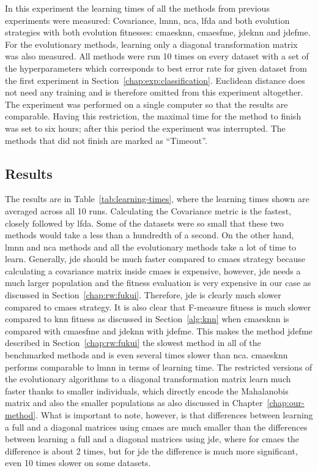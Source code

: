 \documentclass[12pt,a4paper]{report}
\begin{document}
In this experiment the learning times of all the methods from previous experiments were measured: Covariance, \ac{lmnn}, \ac{nca}, \ac{lfda} and both evolution strategies with both evolution fitnesses: \ac{cmaesknn}, \ac{cmaesfme}, \ac{jdeknn} and \ac{jdefme}. For the evolutionary methods, learning only a diagonal transformation matrix was also measured. All methods were run 10 times on every dataset with a set of the hyperparameters which corresponds to best error rate for given dataset from the first experiment in Section~\ref{chap:exp:classification}. Euclidean distance does not need any training and is therefore omitted from this experiment altogether. The experiment was performed on a single computer so that the results are comparable. Having this restriction, the maximal time for the method to finish was set to six hours; after this period the experiment was interrupted. The methods that did not finish are marked as ``Timeout''.

\subsection{Results}

The results are in Table~\ref{tab:learning-times}, where the learning times shown are averaged across all 10 runs. Calculating the Covariance metric is the fastest, closely followed by \ac{lfda}. Some of the datasets were so small that these two methods would take a less than a hundredth of a second. On the other hand, \ac{lmnn} and \ac{nca} methods and all the evolutionary methods take a lot of time to learn. Generally, \ac{jde} should be much faster compared to \ac{cmaes} strategy because calculating a covariance matrix inside \ac{cmaes} is expensive, however, \ac{jde} needs a much larger population and the fitness evaluation is very expensive in our case as discussed in Section~\ref{chap:rw:fukui}. Therefore, \ac{jde} is clearly much slower compared to \ac{cmaes} strategy. It is also clear that \mbox{F-measure} fitness is much slower compared to \ac{knn} fitness as discussed in Section~\ref{alg:knn} when \ac{cmaesknn} is compared with \ac{cmaesfme} and \ac{jdeknn} with \ac{jdefme}. This makes the method \ac{jdefme} described in Section~\ref{chap:rw:fukui} the slowest method in all of the benchmarked methods and is even several times slower than \ac{nca}. \ac{cmaesknn} performs comparable to \ac{lmnn} in terms of learning time. The restricted versions of the evolutionary algorithms to a diagonal transformation matrix learn much faster thanks to smaller individuals, which directly encode the Mahalanobis matrix and also the smaller populations as also discussed in Chapter~\ref{chap:our-method}. What is important to note, however, is that differences between learning a full and a diagonal matrices using \ac{cmaes} are much smaller than the differences between learning a full and a diagonal matrices using \ac{jde}, where for \ac{cmaes} the difference is about 2 times, but for \ac{jde} the difference is much more significant, even 10 times slower on some datasets.
\end{document}
